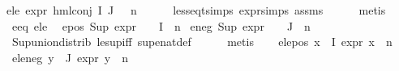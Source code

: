 \begin{isabellebody}
e{}{\isacharunderscore}{\kern0pt}le{\isacharcolon}{\kern0pt}\ {\isachardoublequoteopen}expr{\isacharunderscore}{\kern0pt}{}\ {\isacharparenleft}{\kern0pt}hml{\isacharunderscore}{\kern0pt}conj\ I\ J\ {\isasymPhi}{\isacharparenright}{\kern0pt}\ {\isasymle}\ n{}{\isachardoublequoteclose}\isanewline
\ \ \ \ \isamarkupfalse%
\ less{\isacharunderscore}{\kern0pt}eq{\isacharunderscore}{\kern0pt}t{\isachardot}{\kern0pt}simps\ expr{\isachardot}{\kern0pt}simps\ assms\isanewline
\ \ \ \ \isamarkupfalse%
\ metis{\isacharplus}{\kern0pt}\isanewline
\isanewline
\ \ \isamarkupfalse%
\ e{}{\isacharunderscore}{\kern0pt}eq\ e{}{\isacharunderscore}{\kern0pt}le\ \isamarkupfalse%
\ e{}{\isacharunderscore}{\kern0pt}pos{\isacharcolon}{\kern0pt}\ {\isachardoublequoteopen}Sup\ {\isacharparenleft}{\kern0pt}{\isacharparenleft}{\kern0pt}expr{\isacharunderscore}{\kern0pt}{}\ {\isasymcirc}\ {\isasymPhi}{\isacharparenright}{\kern0pt}\ {\isacharbackquote}{\kern0pt}\ I{\isacharparenright}{\kern0pt}\ {\isasymle}\ n{}{\isachardoublequoteclose}\isanewline
{}\ e{}{\isacharunderscore}{\kern0pt}neg{\isacharcolon}{\kern0pt}\ {\isachardoublequoteopen}Sup\ {\isacharparenleft}{\kern0pt}{\isacharparenleft}{\kern0pt}expr{\isacharunderscore}{\kern0pt}{}\ {\isasymcirc}\ {\isasymPhi}{\isacharparenright}{\kern0pt}\ {\isacharbackquote}{\kern0pt}\ J{\isacharparenright}{\kern0pt}\ {\isasymle}\ n{}{\isachardoublequoteclose}\isanewline
\ \ \ \ \isamarkupfalse%
\ Sup{\isacharunderscore}{\kern0pt}union{\isacharunderscore}{\kern0pt}distrib\ le{\isacharunderscore}{\kern0pt}sup{\isacharunderscore}{\kern0pt}iff\ sup{\isacharunderscore}{\kern0pt}enat{\isacharunderscore}{\kern0pt}def\isanewline
\ \ \ \ \isamarkupfalse%
\ metis{\isacharplus}{\kern0pt}\isanewline
\ \ \isamarkupfalse%
\ e{}{\isacharunderscore}{\kern0pt}le{\isacharunderscore}{\kern0pt}pos{\isacharcolon}{\kern0pt}\ {\isachardoublequoteopen}{\isasymforall}x{\isasymin}{\isasymPhi}\ {\isacharbackquote}{\kern0pt}\ I{\isachardot}{\kern0pt}\ expr{\isacharunderscore}{\kern0pt}{}\ x\ {\isasymle}\ n{}{\isachardoublequoteclose}\isanewline
{}\ e{}{\isacharunderscore}{\kern0pt}le{\isacharunderscore}{\kern0pt}neg{\isacharcolon}{\kern0pt}\ {\isachardoublequoteopen}{\isasymforall}y{\isasymin}{\isasymPhi}\ {\isacharbackquote}{\kern0pt}\ J{\isachardot}{\kern0pt}\ expr{\isacharunderscore}{\kern0pt}{}\ y\ {\isasymle}\ n{}{\isachardoublequoteclose}\isanewline

\end{isabellebody}
